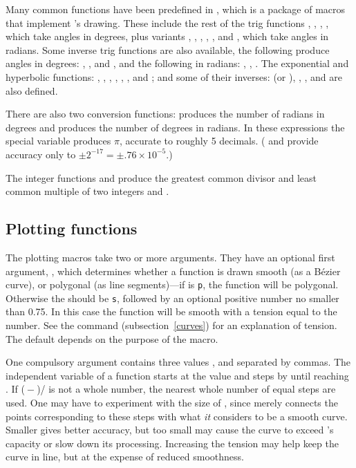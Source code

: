 \documentclass[letterpaper]{article}
\begin{document}
Many common functions have been predefined in , which is
a package of \MF{} macros that implement 's drawing. These
include the rest of the trig functions , , ,
, which take angles in degrees, plus variants ,
, , , , and , which take
angles in radians. Some inverse trig functions are also available, the
following produce angles in degrees: , , and
, and the following in radians: , ,
. The exponential and hyperbolic functions: ,
, , , , , and
; and some of their inverses:  (or ),
, , and  are also defined.

There are also two conversion functions:  produces the
number of radians in  degrees and  produces the
number of degrees in  radians. In these expressions the special
variable  produces $\pi$, accurate to roughly 5 decimals.
(\CMF{} and \MP{} provide accuracy only to $\pm2^{-17} = \pm
.76\times10^{-5}$.)

The integer functions  and  produce the
greatest common divisor and least common multiple of two integers
 and .


\subsection{Plotting functions}\label{plotting}

The plotting macros take two or more arguments. They have an optional
first argument, , which determines whether a function is
drawn smooth (as a \MF{} B\'ezier curve), or polygonal (as line
segments)---if  is \texttt{p}, the function will be
polygonal. Otherwise the  should be \texttt{s}, followed by
an optional positive number no smaller than 0.75. In this case the
function will be smooth with a tension equal to the number. See the
 command (subsection~\ref{curves}) for an explanation of
tension. The default  depends on the purpose of the macro.

One compulsory argument contains three values ,  and
 separated by commas. The independent variable of a function
starts at the value  and steps by  until reaching
. If (${}-{}$)/ is not a whole
number, the nearest whole number of equal steps are used. One may have
to experiment with the size of , since \MF{} merely connects
the points corresponding to these steps with what \emph{it} considers to
be a smooth curve. Smaller  gives better accuracy, but too
small may cause the curve to exceed \MF{}'s capacity or slow down its
processing. Increasing the tension may help keep the curve in line, but
at the expense of reduced smoothness.
\end{document}
